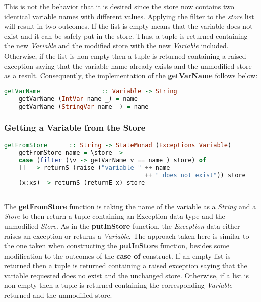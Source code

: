 \documentclass[a4paper, onecolumn]{article}
\begin{document}
    \noindent This is not the behavior that it is desired since the store now contains two identical variable names with different values. Applying the filter to the \textit{store} list will result in two outcomes. If the list is empty means that the variable does not exist and it can be safely put in the store. Thus, a tuple is returned containing the new \textit{Variable} and the modified store with the new \textit{Variable} included. Otherwise, if the list is non empty then a tuple is returned containing a raised exception saying that the variable name already exists and the unmodified store as a result. Consequently, the implementation of the \textbf{getVarName} follows below: 
    
    \begin{tcolorbox}
    \begin{lstlisting}[language=Haskell] 
    getVarName                 :: Variable -> String
    getVarName (IntVar name _) = name
    getVarName (StringVar name _) = name
    \end{lstlisting}
    \end{tcolorbox}
    
    \subsubsection{Getting a Variable from the Store}
    
    \begin{tcolorbox}
    \begin{lstlisting}[language=Haskell] 
    getFromStore      :: String -> StateMonad (Exceptions Variable)
    getFromStore name = \store -> 
    case (filter (\v -> getVarName v == name ) store) of 
    []  -> returnS (raise ("variable " ++ name 
                                       ++ " does not exist")) store 
    (x:xs) -> returnS (returnE x) store 
    
    \end{lstlisting}
    \end{tcolorbox}
    
    \noindent The \textbf{getFromStore} function is taking the name of the variable as a \textit{String} and a \textit{Store} to then return a tuple containing an Exception data type and the unmodified \textit{Store}. As in the \textbf{putInStore} function, the \textit{Exception} data either raises an exception or returns a \textit{Variable}. The approach taken here is similar to the one taken when constructing the \textbf{putInStore} function, besides some modification to the outcomes of the \textbf{case of} construct. If an empty list is returned then a tuple is returned containing a raised exception saying that the variable requested does no exist and the unchanged store. Otherwise, if a list is non empty then a tuple is returned containing the corresponding \textit{Variable} returned and the unmodified store. 
    
\end{document}
